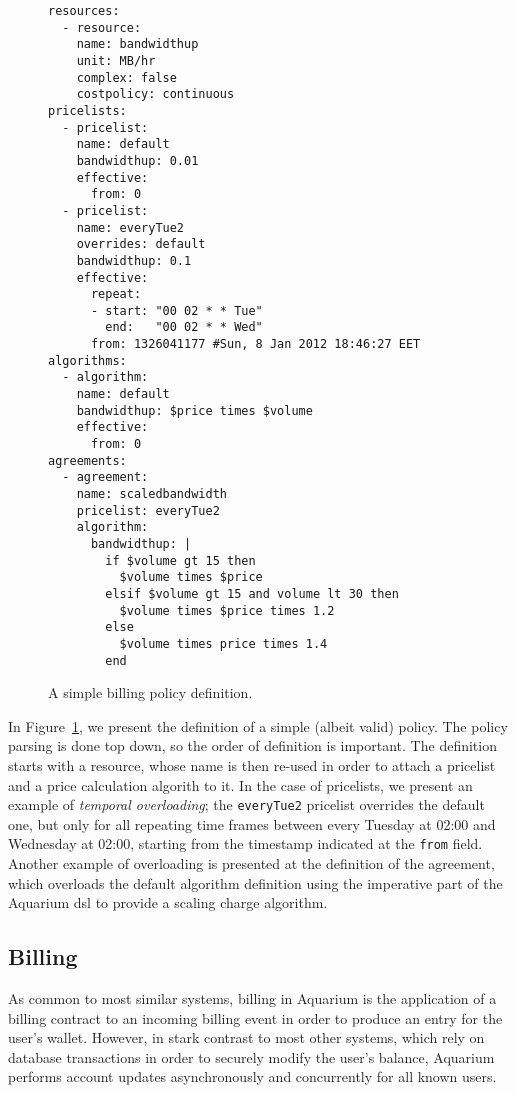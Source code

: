 \documentclass[preprint,10pt]{sigplanconf}
\begin{document}
\begin{figure}
\lstset{language=ruby, basicstyle=\footnotesize,
stringstyle=\ttfamily, 
flexiblecolumns=true, aboveskip=-0.9em, belowskip=0em, lineskip=0em}

\begin{lstlisting}
resources:
  - resource:
    name: bandwidthup
    unit: MB/hr
    complex: false
    costpolicy: continuous
pricelists:
  - pricelist: 
    name: default
    bandwidthup: 0.01
    effective:
      from: 0
  - pricelist: 
    name: everyTue2
    overrides: default
    bandwidthup: 0.1
    effective:
      repeat:
      - start: "00 02 * * Tue"
        end:   "00 02 * * Wed"
      from: 1326041177 #Sun, 8 Jan 2012 18:46:27 EET
algorithms:
  - algorithm:
    name: default
    bandwidthup: $price times $volume
    effective:
      from: 0
agreements:
  - agreement:
    name: scaledbandwidth
    pricelist: everyTue2
    algorithm:
      bandwidthup: |
        if $volume gt 15 then
          $volume times $price
        elsif $volume gt 15 and volume lt 30 then
          $volume times $price times 1.2
        else
          $volume times price times 1.4
        end
\end{lstlisting}

\caption{A simple billing policy definition.} 
\label{fig:dsl}
\end{figure}

In Figure~\ref{fig:dsl}, we present the definition of a simple (albeit valid) 
policy. The policy parsing is done top down, so the order of definition 
is important. The definition starts with a resource, whose name is then
re-used in order to attach a pricelist and a price calculation algorith to it.
In the case of pricelists, we present an example of \emph{temporal overloading};
the \texttt{everyTue2} pricelist overrides the default one, but only for 
all repeating time frames between every Tuesday at 02:00 and Wednesday at
02:00, starting from the timestamp indicated at the \texttt{from} field. Another
example of overloading is presented at the definition of the agreement, which
overloads the default algorithm definition using the imperative part of the
Aquarium {\sc dsl} to provide a scaling charge algorithm.

\subsection{Billing}

As common to most similar systems, billing in Aquarium is the application of
a billing contract to an incoming billing event in order to produce an 
entry for the user's wallet. However, in stark contrast to most other systems,
which rely on database transactions in order to securely modify the user's
balance, Aquarium performs account updates asynchronously and concurrently
for all known users.
\end{document}
